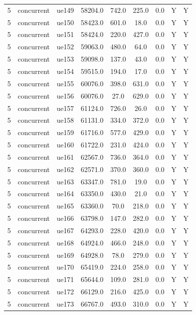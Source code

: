 \begin{table}[ht]
\begin{tabular}{|c|c|c|c|c|c|c|c|c|}
5 & concurrent & ue149 & 58204.0 & 742.0 & 225.0 & 0.0 & Y & Y \\
5 & concurrent & ue150 & 58423.0 & 601.0 & 18.0 & 0.0 & Y & Y \\
5 & concurrent & ue151 & 58424.0 & 220.0 & 427.0 & 0.0 & Y & Y \\
5 & concurrent & ue152 & 59063.0 & 480.0 & 64.0 & 0.0 & Y & Y \\
5 & concurrent & ue153 & 59098.0 & 137.0 & 43.0 & 0.0 & Y & Y \\
5 & concurrent & ue154 & 59515.0 & 194.0 & 17.0 & 0.0 & Y & Y \\
5 & concurrent & ue155 & 60076.0 & 398.0 & 631.0 & 0.0 & Y & Y \\
5 & concurrent & ue156 & 60076.0 & 27.0 & 629.0 & 0.0 & Y & Y \\
5 & concurrent & ue157 & 61124.0 & 726.0 & 26.0 & 0.0 & Y & Y \\
5 & concurrent & ue158 & 61131.0 & 334.0 & 372.0 & 0.0 & Y & Y \\
5 & concurrent & ue159 & 61716.0 & 577.0 & 429.0 & 0.0 & Y & Y \\
5 & concurrent & ue160 & 61722.0 & 231.0 & 424.0 & 0.0 & Y & Y \\
5 & concurrent & ue161 & 62567.0 & 736.0 & 364.0 & 0.0 & Y & Y \\
5 & concurrent & ue162 & 62571.0 & 370.0 & 360.0 & 0.0 & Y & Y \\
5 & concurrent & ue163 & 63347.0 & 781.0 & 19.0 & 0.0 & Y & Y \\
5 & concurrent & ue164 & 63350.0 & 430.0 & 21.0 & 0.0 & Y & Y \\
5 & concurrent & ue165 & 63360.0 & 70.0 & 218.0 & 0.0 & Y & Y \\
5 & concurrent & ue166 & 63798.0 & 147.0 & 282.0 & 0.0 & Y & Y \\
5 & concurrent & ue167 & 64293.0 & 228.0 & 420.0 & 0.0 & Y & Y \\
5 & concurrent & ue168 & 64924.0 & 466.0 & 248.0 & 0.0 & Y & Y \\
5 & concurrent & ue169 & 64928.0 & 78.0 & 279.0 & 0.0 & Y & Y \\
5 & concurrent & ue170 & 65419.0 & 224.0 & 258.0 & 0.0 & Y & Y \\
5 & concurrent & ue171 & 65644.0 & 109.0 & 281.0 & 0.0 & Y & Y \\
5 & concurrent & ue172 & 66129.0 & 216.0 & 425.0 & 0.0 & Y & Y \\
5 & concurrent & ue173 & 66767.0 & 493.0 & 310.0 & 0.0 & Y & Y \\

\end{tabular}
\end{table}
